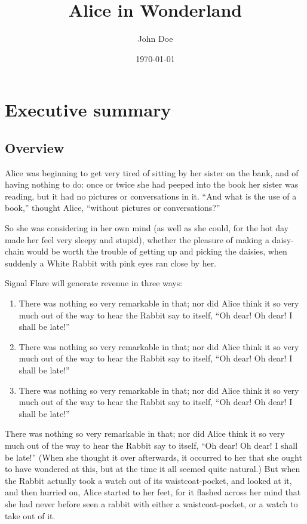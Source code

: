 \documentclass[12pt]{article}
\author{John Doe}
\date{\today}
\title{Alice in Wonderland}
\begin{document}
\maketitle
\tableofcontents
\newpage

\section{Executive summary}
\label{sec-1}
\subsection{Overview}
\label{sec-1-1}
Alice was beginning to get very tired of sitting by her sister on the bank, and of having nothing to do: once or twice she had peeped into the book her sister was reading, but it had no pictures or conversations in it. ``And what is the use of a book,'' thought Alice, ``without pictures or conversations?'' 

So she was considering in her own mind (as well as she could, for the hot day made her feel very sleepy and stupid), whether the pleasure of making a daisy-chain would be worth the trouble of getting up and picking the daisies, when suddenly a White Rabbit with pink eyes ran close by her. 

Signal Flare will generate revenue in three ways: 
\begin{enumerate}
\item There was nothing so very remarkable in that; nor did Alice think it so very much out of the way to hear the Rabbit say to itself, ``Oh dear! Oh dear! I shall be late!''
\item There was nothing so very remarkable in that; nor did Alice think it so very much out of the way to hear the Rabbit say to itself, ``Oh dear! Oh dear! I shall be late!''
\item There was nothing so very remarkable in that; nor did Alice think it so very much out of the way to hear the Rabbit say to itself, ``Oh dear! Oh dear! I shall be late!''
\end{enumerate}

There was nothing so very remarkable in that; nor did Alice think it so very much out of the way to hear the Rabbit say to itself, ``Oh dear! Oh dear! I shall be late!'' (When she thought it over afterwards, it occurred to her that she ought to have wondered at this, but at the time it all seemed quite natural.) But when the Rabbit actually took a watch out of its waistcoat-pocket, and looked at it, and then hurried on, Alice started to her feet, for it flashed across her mind that she had never before seen a rabbit with either a waistcoat-pocket, or a watch to take out of it. 
\end{document}

